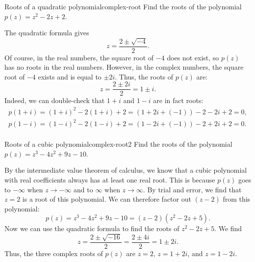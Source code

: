 \begin{example}{Roots of a quadratic polynomial}{complex-root}
  Find the roots of the polynomial $p(z) = z^2 - 2z + 2$.
\end{example}

\begin{solution}
  The quadratic formula gives
  \begin{equation*}
    z = \frac{2 \pm \sqrt{-4}}{2}.
  \end{equation*}
  Of course, in the real numbers, the square root of $-4$ does not
  exist, so $p(z)$ has no roots in the real numbers. However, in the
  complex numbers, the square root of $-4$ exists and is equal to
  $\pm2i$. Thus, the roots of $p(z)$ are:
  \begin{equation*}
    z = \frac{2 \pm 2i}{2} = 1\pm i.
  \end{equation*}
  Indeed, we can double-check that $1+i$ and $1-i$ are in fact roots:
  \begin{equation*}
    \begin{array}{ll}
      p(1+i) = (1+i)^2 - 2(1+i) + 2 = (1 + 2i + (-1)) - 2 - 2i + 2 = 0, \\
      p(1-i) = (1-i)^2 - 2(1-i) + 2 = (1 - 2i + (-1)) - 2 + 2i + 2 = 0. \\
    \end{array}
  \end{equation*}
  \vspace{-2ex}
\end{solution}

\begin{example}{Roots of a cubic polynomial}{complex-root2}
  Find the roots of the polynomial $p(z) = z^3 - 4z^2 + 9z - 10$.
\end{example}

\begin{solution}
  By the intermediate value theorem of calculus, we know that a cubic
  polynomial with real coefficients always has at least one real
  root. This is because $p(z)$ goes to $-\infty$ when $z\to-\infty$
  and to $\infty$ when $z\to\infty$. By trial and error, we find that
  $z=2$ is a root of this polynomial. We can therefore factor out
  $(z-2)$ from this polynomial:
  \begin{equation*}
    p(z) = z^3 - 4z^2 + 9z - 10 = (z-2)(z^2 - 2z + 5).
  \end{equation*}
  Now we can use the quadratic formula to find the roots of $z^2 - 2z
  + 5$. We find
  \begin{equation*}
    z = \frac{2\pm\sqrt{-16}}{2} = \frac{2\pm 4i}{2} = 1\pm 2i.
  \end{equation*}
  Thus, the three complex roots of $p(z)$ are $z=2$, $z=1+2i$, and $z=1-2i$.
\end{solution}

